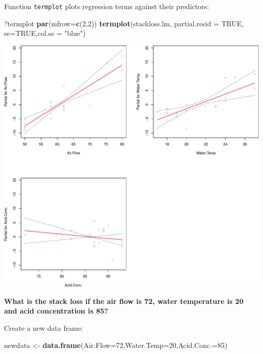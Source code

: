 \documentclass[]{article}
\newenvironment{Shaded}{\begin{snugshade}}{\end{snugshade}}
\newcommand{\KeywordTok}[1]{\textcolor[rgb]{0.13,0.29,0.53}{\textbf{{#1}}}}
\newcommand{\DataTypeTok}[1]{\textcolor[rgb]{0.13,0.29,0.53}{{#1}}}
\newcommand{\DecValTok}[1]{\textcolor[rgb]{0.00,0.00,0.81}{{#1}}}
\newcommand{\StringTok}[1]{\textcolor[rgb]{0.31,0.60,0.02}{{#1}}}
\newcommand{\OtherTok}[1]{\textcolor[rgb]{0.56,0.35,0.01}{{#1}}}
\newcommand{\NormalTok}[1]{{#1}}
\numberwithin{equation}{section}
\begin{document}
Function \texttt{termplot} plots regression terms against their
predictors:

\begin{Shaded}
\begin{Highlighting}[]
\NormalTok{?termplot}
\KeywordTok{par}\NormalTok{(}\DataTypeTok{mfrow=}\KeywordTok{c}\NormalTok{(}\DecValTok{2}\NormalTok{,}\DecValTok{2}\NormalTok{))}
\KeywordTok{termplot}\NormalTok{(stackloss.lm, }\DataTypeTok{partial.resid =} \OtherTok{TRUE}\NormalTok{, }\DataTypeTok{se=}\OtherTok{TRUE}\NormalTok{,}\DataTypeTok{col.se =} \StringTok{"blue"}\NormalTok{)}
\end{Highlighting}
\end{Shaded}

\includegraphics{index_files/figure-latex/unnamed-chunk-207-1.pdf}

\textbf{What is the stack loss if the air flow is 72, water temperature
is 20 and acid concentration is 85?}

Create a new data frame:

\begin{Shaded}
\begin{Highlighting}[]
\NormalTok{newdata <-}\StringTok{ }\KeywordTok{data.frame}\NormalTok{(}\DataTypeTok{Air.Flow=}\DecValTok{72}\NormalTok{,}\DataTypeTok{Water.Temp=}\DecValTok{20}\NormalTok{,}\DataTypeTok{Acid.Conc.=}\DecValTok{85}\NormalTok{)}
\end{Highlighting}
\end{Shaded}
\end{document}
